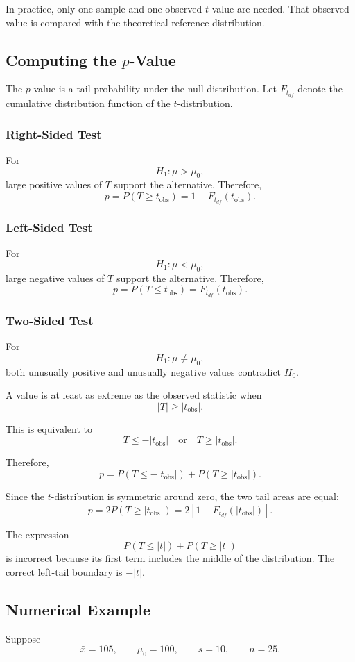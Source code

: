 \documentclass[11pt]{article}
\begin{document}
In practice, only one sample and one observed \(t\)-value are needed. That observed value is compared with the theoretical reference distribution.

\subsection{Computing the \(p\)-Value}
The \(p\)-value is a tail probability under the null distribution. Let \(F_{t_{df}}\) denote the cumulative distribution function of the \(t\)-distribution.

\subsubsection{Right-Sided Test}
For
\[
H_1:\mu>\mu_0,
\]
large positive values of \(T\) support the alternative. Therefore,
\[
p=P(T\geq t_{\mathrm{obs}})
=1-F_{t_{df}}(t_{\mathrm{obs}}).
\]

\subsubsection{Left-Sided Test}
For
\[
H_1:\mu<\mu_0,
\]
large negative values of \(T\) support the alternative. Therefore,
\[
p=P(T\leq t_{\mathrm{obs}})
=F_{t_{df}}(t_{\mathrm{obs}}).
\]

\subsubsection{Two-Sided Test}
For
\[
H_1:\mu\neq\mu_0,
\]
both unusually positive and unusually negative values contradict \(H_0\).

A value is at least as extreme as the observed statistic when
\[
|T|\geq |t_{\mathrm{obs}}|.
\]

This is equivalent to
\[
T\leq -|t_{\mathrm{obs}}|
\quad \text{or} \quad
T\geq |t_{\mathrm{obs}}|.
\]

Therefore,
\[
p=P(T\leq -|t_{\mathrm{obs}}|)
 +P(T\geq |t_{\mathrm{obs}}|).
\]

Since the \(t\)-distribution is symmetric around zero, the two tail areas are equal:
\[
p=2P(T\geq |t_{\mathrm{obs}}|)
=2\left[1-F_{t_{df}}\left(|t_{\mathrm{obs}}|\right)\right].
\]

The expression
\[
P(T\leq |t|)+P(T\geq |t|)
\]
is incorrect because its first term includes the middle of the distribution. The correct left-tail boundary is \(-|t|\).

\subsection{Numerical Example}
Suppose
\[
\bar{x}=105,\qquad
\mu_0=100,\qquad
s=10,\qquad
n=25.
\]
\end{document}
